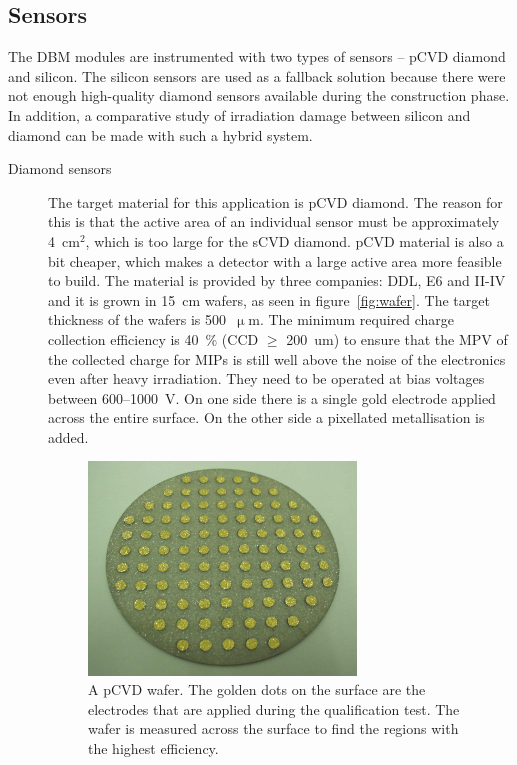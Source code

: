 \subsection{Sensors}
The DBM modules are instrumented with two types of sensors -- pCVD diamond and silicon. The silicon sensors are used as a fallback solution because there were not enough high-quality diamond sensors available during the construction phase. In addition, a comparative study of irradiation damage between silicon and diamond can be made with such a hybrid system.

 
\begin{description}
\item[Diamond sensors] The target material for this application is pCVD diamond. The reason for this is that the active area of an individual sensor must be approximately 4~cm$^2$, which is too large for the sCVD diamond. pCVD material is also a bit cheaper, which makes a detector with a large active area more feasible to build. The material is provided by three companies: DDL, E6 and II-IV and it is grown in 15~cm wafers, as seen in figure~\ref{fig:wafer}. The target thickness of the wafers is 500~$\upmu$m. The minimum required charge collection efficiency is 40~\% (CCD $\geq$ 200~um) to ensure that the MPV of the collected charge for MIPs is still well above the noise of the electronics even after heavy irradiation. They need to be operated at bias voltages between 600--1000~V. On one side there is a single gold electrode applied across the entire surface. On the other side a pixellated metallisation is added. 
\begin{figure}[!t]
\centering
\includegraphics[width=0.7\textwidth]{04_charge_monitoring/pics/wafer}
\caption{A pCVD wafer. The golden dots on the surface are the electrodes that are applied during the qualification test. The wafer is measured across the surface to find the regions with the highest efficiency.}

\end{figure}
\end{description}
